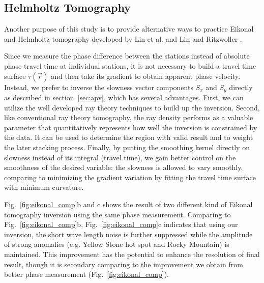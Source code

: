 \documentclass[referee]{gji}
\begin{document}
\subsection{Helmholtz Tomography}

Another purpose of this study is to provide alternative ways to practice Eikonal and Helmholtz tomography developed by Lin et al.  and Lin and Ritzwoller . 

Since we measure the phase difference between the stations instead of absolute phase travel time at individual stations, it is not necessary to build a travel time surface $\tau(\vec{r})$ and then take its gradient to obtain apparent phase velocity. Instead, we prefer to inverse the slowness vector components $S_x$ and $S_y$ directly as described in section~\ref{sec:apv}, which has several advantages. First, we can utilize the  well developed ray theory techniques to build up the inversion. Second, like conventional ray theory tomography, the ray density performs as a valuable parameter that quantitatively represents how well the inversion is constrained by the data. It can be used to determine the region with valid result and to weight the later stacking process. Finally, by putting the smoothing kernel directly on slowness instead of its integral (travel time), we gain better control on the smoothness of the desired variable: the slowness is allowed to vary smoothly, comparing to minimizing the gradient variation by fitting the travel time surface with minimum curvature. 

Fig.~\ref{fig:eikonal_comp}b and c shows the result of two different kind of Eikonal tomography inversion using the same phase measurement. Comparing to Fig.~\ref{fig:eikonal_comp}b, Fig.~\ref{fig:eikonal_comp}c indicates that using our inversion, the short wave length noise is further suppressed while the amplitude of strong anomalies (e.g. Yellow Stone hot spot and Rocky Mountain) is maintained. This improvement has the potential to enhance the resolution of final result, though it is secondary comparing to the improvement we obtain from better phase measurement (Fig.~\ref{fig:eikonal_comp}). 
\end{document}
